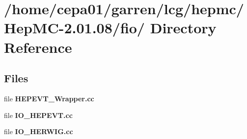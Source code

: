 \section{/home/cepa01/garren/lcg/hepmc/Hep\-MC-2.01.08/fio/ Directory Reference}
\label{dir_2f7e53fbf59743acafe0a1c443dedb88}
\subsection*{Files}
\begin{CompactItemize}
\item 
file {\bf HEPEVT\_\-Wrapper.cc}
\item 
file {\bf IO\_\-HEPEVT.cc}
\item 
file {\bf IO\_\-HERWIG.cc}
\end{CompactItemize}
